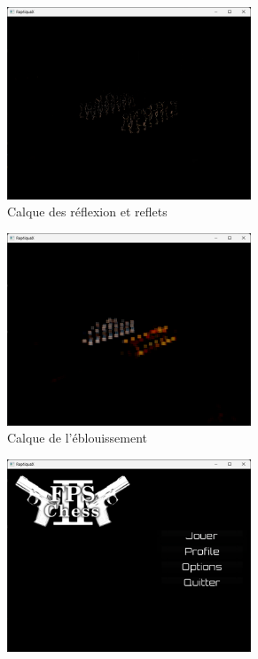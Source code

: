 \begin{figure}[H]
\begin{subfigure}{0.3\textwidth}
            \includegraphics[width=0.8\textwidth]{images/raptiquax_rendering_ssr.png}
            \caption{Calque des réflexion et reflets}
            \label{fig:graphics_pipeline_gbuffer_ssr}
        \end{subfigure}
        \begin{subfigure}{0.3\textwidth}
            \centering
            \includegraphics[width=0.8\textwidth]{images/raptiquax_rendering_bloom.png}
            \caption{Calque de l'éblouissement}
            \label{fig:graphics_pipeline_gbuffer_bloom}
        \end{subfigure}
        \begin{subfigure}{0.3\textwidth}
            \centering
            \includegraphics[width=0.8\textwidth]{images/raptiquax_rendering_gui.png}

\end{subfigure}
\end{figure}
